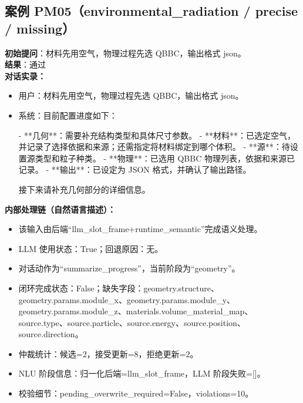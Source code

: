 \documentclass[11pt]{ctexart}
\begin{document}
\subsection{案例 PM05（environmental\_radiation / precise / missing）}
\textbf{初始提问}：材料先用空气，物理过程先选 QBBC，输出格式 json。\\
\textbf{结果}：通过\\
\textbf{对话实录：}
\begin{itemize}
\item 用户：材料先用空气，物理过程先选 QBBC，输出格式 json。
\item 系统：目前配置进度如下：

- **几何**：需要补充结构类型和具体尺寸参数。
- **材料**：已选定空气，并记录了选择依据和来源；还需指定将材料绑定到哪个体积。
- **源**：待设置源类型和粒子种类。
- **物理**：已选用 QBBC 物理列表，依据和来源已记录。
- **输出**：已设定为 JSON 格式，并确认了输出路径。

接下来请补充几何部分的详细信息。
\end{itemize}
\textbf{内部处理链（自然语言描述）：}
\begin{itemize}
\item 该输入由后端“llm\_slot\_frame+runtime\_semantic”完成语义处理。
\item LLM 使用状态：True；回退原因：无。
\item 对话动作为“summarize\_progress”，当前阶段为“geometry”。
\item 闭环完成状态：False；缺失字段：geometry.structure、geometry.params.module\_x、geometry.params.module\_y、geometry.params.module\_z、materials.volume\_material\_map、source.type、source.particle、source.energy、source.position、source.direction。
\item 仲裁统计：候选=2，接受更新=8，拒绝更新=2。
\item NLU 阶段信息：归一化后端=llm\_slot\_frame，LLM 阶段失败=[]。
\item 校验细节：pending\_overwrite\_required=False，violations=10。
\end{itemize}
\end{document}
